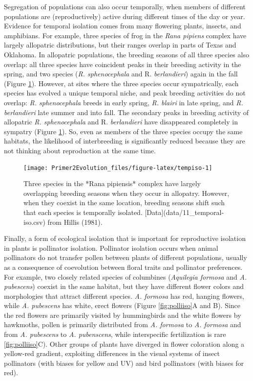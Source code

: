 \documentclass[
]{book}
\begin{document}
Segregation of populations can also occur temporally, when members of different populations are (reproductively) active during different times of the day or year. Evidence for temporal isolation comes from many flowering plants, insects, and amphibians. For example, three species of frog in the \emph{Rana pipiens} complex have largely allopatric distributions, but their ranges overlap in parts of Texas and Oklahoma. In allopatric populations, the breeding seasons of all three species also overlap: all three species have coincident peaks in their breeding activity in the spring, and two species (\emph{R. sphenocephala} and R. \emph{berlandieri}) again in the fall (Figure \ref{fig:tempiso}). However, at sites where the three species occur sympatrically, each species has evolved a unique temporal niche, and peak breeding activities do not overlap: \emph{R. sphenocephala} breeds in early spring, \emph{R. blairi} in late spring, and \emph{R. berlandieri} late summer and into fall. The secondary peaks in breeding activity of allopatric \emph{R. sphenocephala} and R. \emph{berlandieri} have disappeared completely in sympatry (Figure \ref{fig:tempiso}). So, even as members of the three species occupy the same habitats, the likelihood of interbreeding is significantly reduced because they are not thinking about reproduction at the same time.

\begin{figure}
\texttt{[image: Primer2Evolution\_files/figure-latex/tempiso-1]} \caption{Three species in the *Rana pipiensis* complex have largely overlapping breeding seasons when they occur in allopatry. However, when they coexist in the same location, breeding seasons shift such that each species is temporally isolated. [Data](data/11_temporal-iso.csv) from Hillis (1981).}\label{fig:tempiso}
\end{figure}

Finally, a form of ecological isolation that is important for reproductive isolation in plants is pollinator isolation. Pollinator isolation occurs when animal pollinators do not transfer pollen between plants of different populations, usually as a consequence of coevolution between floral traits and pollinator preferences. For example, two closely related species of columbines (\emph{Aquilegia formosa} and \emph{A. pubescens}) coexist in the same habitat, but they have different flower colors and morphologies that attract different species. \emph{A. formosa} has red, hanging flowers, while \emph{A. pubescens} has white, erect flowers (Figure \ref{fig:polliiso}A and B). Since the red flowers are primarily visited by hummingbirds and the white flowers by hawkmoths, pollen is primarily distributed from \emph{A. formosa} to \emph{A. formosa} and from \emph{A. pubescens} to \emph{A. pubenscens}, while interspecific fertilization is rare \ref{fig:polliiso}C). Other groups of plants have diverged in flower coloration along a yellow-red gradient, exploiting differences in the visual systems of insect pollinators (with biases for yellow and UV) and bird pollinators (with biases for red).
\end{document}
